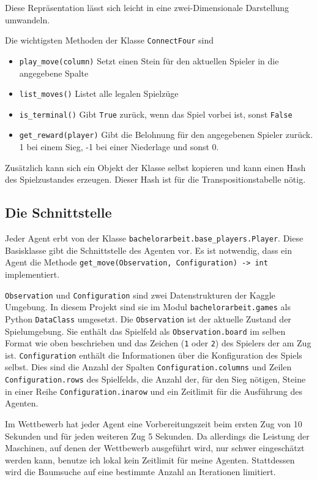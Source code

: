 Diese Repräsentation lässt sich leicht in eine zwei-Dimensionale Darstellung umwandeln.

Die wichtigsten Methoden der Klasse \verb|ConnectFour| sind
\begin{itemize}
	\item \verb|play_move(column)| Setzt einen Stein für den aktuellen Spieler in die angegebene Spalte
	\item \verb|list_moves()| Listet alle legalen Spielzüge
	\item \verb|is_terminal()| Gibt \verb|True| zurück, wenn das Spiel vorbei ist, sonst \verb|False|
	\item \verb|get_reward(player)| Gibt die Belohnung für den angegebenen Spieler zurück.\\1 bei einem Sieg, -1 bei einer Niederlage und sonst 0.
\end{itemize}

Zusätzlich kann sich ein Objekt der Klasse selbst kopieren und kann einen Hash des Spielzustandes erzeugen.
Dieser Hash ist für die Transpositionstabelle nötig.

\subsection{Die Schnittstelle}
\label{chap:schnittstelle}
Jeder Agent erbt von der Klasse \verb|bachelorarbeit.base_players.Player|.
Diese Basisklasse gibt die Schnittstelle des Agenten vor.
Es ist notwendig, dass ein Agent die Methode \verb|get_move(Observation, Configuration) -> int| implementiert.

\verb|Observation| und \verb|Configuration| sind zwei Datenstrukturen der Kaggle Umgebung.
In diesem Projekt sind sie im Modul \verb|bachelorarbeit.games| als Python \verb|DataClass| umgesetzt.
Die \verb|Observation| ist der aktuelle Zustand der Spielumgebung.
Sie enthält das Spielfeld als \verb|Observation.board| im selben Format wie oben beschrieben und das Zeichen (\verb|1| oder \verb|2|) des Spielers der am Zug ist.
\verb|Configuration| enthält die Informationen über die Konfiguration des Spiels selbst.
Dies sind die Anzahl der Spalten \verb|Configuration.columns| und Zeilen \verb|Configuration.rows| des Spielfelds, die Anzahl der, für den Sieg nötigen, Steine in einer Reihe \verb|Configuration.inarow| und ein Zeitlimit für die Ausführung des Agenten.

Im Wettbewerb hat jeder Agent eine Vorbereitungszeit beim ersten Zug von 10 Sekunden und für jeden weiteren Zug 5 Sekunden.
Da allerdings die Leistung der Maschinen, auf denen der Wettbewerb ausgeführt wird, nur schwer eingeschätzt werden kann, benutze ich lokal kein Zeitlimit für meine Agenten.
Stattdessen wird die Baumsuche auf eine bestimmte Anzahl an Iterationen limitiert.

